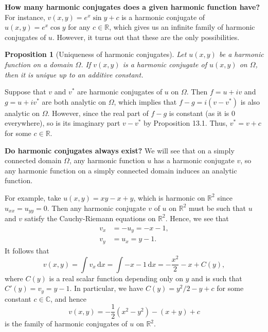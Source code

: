 \documentclass[10pt]{article}
\makeatletter
\newcommand{\R}{\mathbb{R}}
\newcommand{\C}{\mathbb{C}}
\newcommand{\dd}{\,\mathrm{d}}
\theoremstyle{newstyle}
\newtheorem{prop}[thm]{Proposition}
\newenvironment{pf}[1][\proofname]{\par
  \pushQED{\qed}%
  \normalfont \topsep0\p@\relax
  \trivlist
  \item[\hskip\labelsep\scshape
  #1\@addpunct{.}]\ignorespaces
}{%
  \popQED\endtrivlist\@endpefalse
}
\makeatother
\begin{document}
{\bf How many harmonic conjugates does a given harmonic function have?} For instance, 
$v(x, y) = e^x \sin y + c$ is a harmonic conjugate of $u(x, y) = e^x \cos y$ for any $c \in \R$, 
which gives us an infinite family of harmonic conjugates of $u$. However, it turns out that these are the 
only possibilities. 

\begin{prop}[Uniqueness of harmonic conjugates]
Let $u(x, y)$ be a harmonic function on a domain $\Omega$. If $v(x, y)$ is a harmonic conjugate of 
$u(x, y)$ on $\Omega$, then it is unique up to an additive constant. 
\end{prop}
\begin{pf}
Suppose that $v$ and $v^*$ are harmonic conjugates of $u$ on $\Omega$. Then $f = u+iv$ 
and $g = u + iv^*$ are both analytic on $\Omega$, which implies that 
$f-g = i(v-v^*)$ is also analytic on $\Omega$. However, since the real part of $f-g$ is 
constant (as it is $0$ everywhere), so is its imaginary part $v - v^*$ by Proposition 13.1. 
Thus, $v^* = v+c$ for some $c \in \R$. 
\end{pf}

{\bf Do harmonic conjugates always exist?} We will see that on a simply connected domain 
$\Omega$, any harmonic function $u$ has a harmonic conjugate $v$, so any harmonic function on 
a simply connected domain induces an analytic function. 

For example, take $u(x, y) = xy - x + y$, which is harmonic on $\R^2$ since $u_{xx} = u_{yy} = 0$. 
Then any harmonic conjugate $v$ of $u$ on $\R^2$ must be such that $u$ and $v$ 
satisfy the Cauchy-Riemann equations on $\R^2$. Hence, we see that 
\begin{align*}
    v_x &= -u_y = -x-1, \\
    v_y &= u_x = y-1.
\end{align*}
It follows that 
\[ v(x, y) = \int v_x \dd x = \int -x-1 \dd x = -\frac{x^2}2 - x + C(y), \] 
where $C(y)$ is a real scalar function depending only on $y$ and is such that $C'(y) = v_y = y-1$. 
In particular, we have $C(y) = y^2/2 - y + c$ for some constant $c \in \C$, and hence 
\[ v(x, y) = -\frac12 (x^2 - y^2) - (x + y) + c \]
is the family of harmonic conjugates of $u$ on $\R^2$. 
\end{document}
